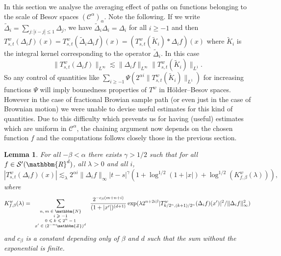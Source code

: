 \documentclass[a4paper,11pt]{article}
\newcommand{\tmscript}[1]{\text{\scriptsize{$#1$}}}
\newtheorem{lemma}[theorem]{Lemma}
\newcommand{\CC}{\mathscr C}
\begin{document}
In this section we analyse the averaging effect of paths on functions
belonging to the scale of Besov spaces $( \CC^{\alpha} )_{\alpha}$. Note the following. If we write $\tilde \Delta_i = \sum_{j:|i-j|\le 1} \Delta_j$, we have $\tilde \Delta_i \Delta _i = \Delta _i$ for all  $i\ge -1$  and then
$
T^{w}_{s,t} ( \Delta_{i} f ) ( x ) =T^{w}_{s,t} ( \tilde \Delta_{i} \Delta_{i} f ) ( x ) =(T^{w}_{s,t} ( \tilde K_{i}  ) * \Delta_{i} f) ( x )
$
where $\tilde K_i$ is the integral kernel corresponding to the operator $\tilde \Delta_{i}$. In this case
\[
\|T^{w}_{s,t} ( \Delta_{i} f )\|_{L^\infty} \lesssim \| \Delta_{i} f \|_{L^\infty}  \|T^{w}_{s,t} ( \tilde K_{i} )\|_{L^1} .
\]
So any control of quantities like
$
\sum_{i \ge -1} \Psi(2^{\alpha i} \|T^{w}_{s,t} ( \tilde K_{i} )\|_{L^1})
$
for increasing functions $\Psi$ will imply bounedness properties of $T^w$ in H\"older--Besov spaces. However in the case of fractional Browian sample path (or even just in the case of Brownian motion) we were unable to devise useful estimates for this kind of quantities.
Due to this difficulty which prevents us for having (useful) estimates which are uniform in $\CC^{\alpha}$,  the chaining argument now depends on the chosen function $f$ and the computations follows closely those in the previous section.

\begin{lemma}
  \label{lemma:chaining_besov}For all $- \beta < \alpha$ there exists $\gamma
  >1/2$ such that for all $f \in \mathcal{S}' ( \mathbbm{R}^{d} )$, all
  $\lambda >0$ and all $i$,
  \[ | T^{w}_{s,t} ( \Delta_{i} f ) ( x ) | \lesssim_{\lambda} 2^{\alpha i}
     \| \Delta_{i} f \|_{\infty} | t-s |^{\gamma} ( 1+ \log^{1/2} ( 1+ | x | )
     + \log^{1/2} ( K^{w}_{f, \beta} ( \lambda ) ) ), \]
  where
  \[ K_{f, \beta}^{w} ( \lambda ) = \sum_{\tmscript{\begin{array}{c}
       n,m \in \mathbbm{N}\\
       i \geqslant -1\\
       0 \leqslant k \leqslant 2^{n} -1\\
       x' \in ( 2^{-m} \mathbbm{Z} )^{d}
     \end{array}}} \frac{2^{-c_{\beta} ( m+n+i )}} {( 1+ | x' | )^{( d+1 )}} \exp (
     \lambda 2^{n+2i \beta} | T^{w}_{k/2^{n} , ( k+1 ) /2^{n}} ( \Delta_{i} f
     ) ( x' ) |^{2} / \| \Delta_{i} f \|_{\infty}^{2} ) \]
  and $c_{\beta}$ is a constant depending only of $\beta$ and $d$ such that
  the sum without the exponential is finite.
\end{lemma}
\end{document}
